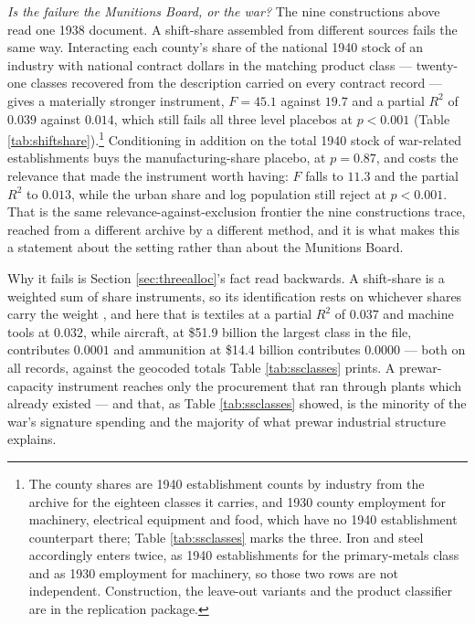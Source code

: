\documentclass[12pt]{article}
\newcommand{\parencite}[1]{\citep{#1}}
\newcommand{\textcite}[1]{\citet{#1}}
\begin{document}
\emph{Is the failure the Munitions Board, or the war?} The nine constructions
above read one 1938 document. A shift-share assembled from different sources
fails the same way. Interacting each county's share of the national 1940 stock of
an industry with national contract dollars in the matching product class ---
twenty-one classes recovered from the description carried on every contract
record --- gives a materially stronger instrument, $F = 45.1$ against $19.7$ and
a partial $R^2$ of $0.039$ against $0.014$, which still fails all three level
placebos at $p<0.001$ (Table \ref{tab:shiftshare}).\footnote{The county shares are 1940 establishment counts by
industry from the \textcite{jaworski2017} archive for the eighteen classes it
carries, and 1930 county employment for machinery, electrical equipment and food,
which have no 1940 establishment counterpart there; Table \ref{tab:ssclasses}
marks the three. Iron and steel accordingly enters twice, as 1940 establishments
for the primary-metals class and as 1930 employment for machinery, so those two
rows are not independent. Construction, the leave-out variants and the product
classifier are in the replication package.} Conditioning in addition on the
total 1940 stock of war-related establishments buys the manufacturing-share
placebo, at $p = 0.87$, and costs the relevance that made the instrument worth
having: $F$ falls to $11.3$ and the partial $R^2$ to $0.013$, while the urban
share and log population still reject at $p<0.001$. That is the same
relevance-against-exclusion frontier the nine constructions trace, reached from a
different archive by a different method, and it is what makes this a statement
about the setting rather than about the Munitions Board.

Why it fails is Section \ref{sec:threealloc}'s fact read backwards. A shift-share is a
weighted sum of share instruments, so its identification rests on whichever
shares carry the weight \parencite{goldsmithpinkham2020}, and here that is
textiles at a partial $R^2$ of $0.037$ and machine tools at $0.032$, while
aircraft, at \$51.9 billion the largest class in the file, contributes $0.0001$
and ammunition at \$14.4 billion contributes $0.0000$ --- both on all records,
against the geocoded totals Table \ref{tab:ssclasses} prints. A prewar-capacity
instrument reaches only the procurement that ran through plants which already
existed --- and that, as Table \ref{tab:ssclasses} showed, is the minority of
the war's signature spending and the majority of what prewar industrial
structure explains.
\end{document}
